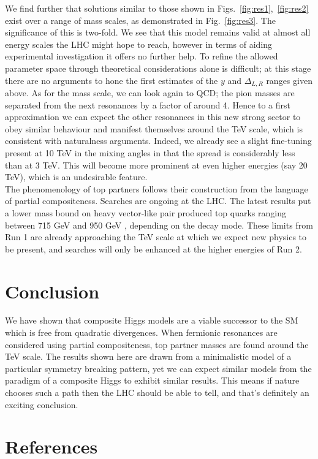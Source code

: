 \documentclass[a4paper]{jpconf}
\begin{document}
\noindent We find further that solutions similar to those shown in Figs.~\ref{fig:res1},~\ref{fig:res2} exist over a range of mass scales, as demonstrated in Fig.~\ref{fig:res3}. The significance of this is two-fold. We see that this model remains valid at almost all energy scales the LHC might hope to reach, however in terms of aiding experimental investigation it offers no further help. To refine the allowed parameter space through theoretical considerations alone is difficult; at this stage there are no arguments to hone the first estimates of the \(y\) and \(\Delta_{L,R}\) ranges given above. As for the mass scale, we can look again to QCD; the pion masses are separated from the next resonances by a factor of around 4. Hence to a first approximation we can expect the other resonances in this new strong sector to obey similar behaviour and manifest themselves around the TeV scale, which is consistent with naturalness arguments. Indeed, we already see a slight fine-tuning present at 10 TeV in the mixing angles in that the spread is considerably less than at 3 TeV. This will become more prominent at even higher energies (say 20 TeV), which is an undesirable feature. \\
\hfill\break
The phenomenology of top partners follows their construction from the language of partial compositeness. Searches are ongoing at the LHC. The latest results put a lower mass bound on heavy vector-like pair produced top quarks ranging between 715 GeV and 950 GeV \cite{atlasExotic}, depending on the decay mode. These limits from Run 1 are already approaching the TeV scale at which we expect new physics to be present, and searches will only be enhanced at the higher energies of Run 2. 

\section{Conclusion}
We have shown that composite Higgs models are a viable successor to the SM which is free from quadratic divergences. When fermionic resonances are considered using partial compositeness, top partner masses are found around the TeV scale. The results shown here are drawn from a minimalistic model of a particular symmetry breaking pattern, yet we can expect similar models from the paradigm of a composite Higgs to exhibit similar results. This means if nature chooses such a path then the LHC should be able to tell, and that's definitely an exciting conclusion.

\section*{References}

\end{document}
